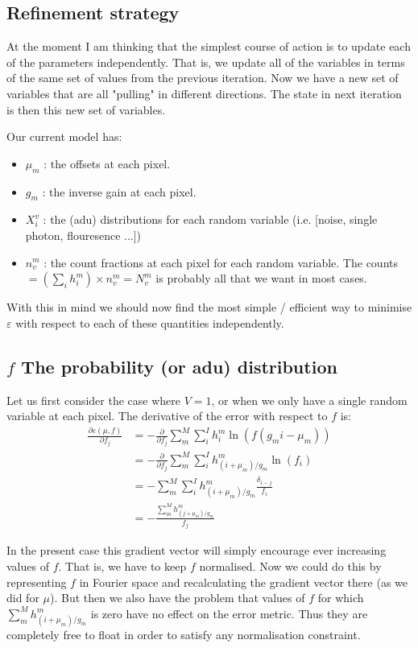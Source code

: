 \documentclass[11pt]{article}
\begin{document}
\subsection{Refinement strategy}
At the moment I am thinking that the simplest course of action is to update each of the parameters independently. That is, we update all of the variables in terms of the same set of values from the previous iteration. Now we have a new set of variables that are all "pulling" in different directions. The state in next iteration is then this new set of variables.

Our current model has:
\begin{itemize}
  \item $\mu_m$ : the offsets at each pixel.
  \item $g_m$   : the inverse gain at each pixel.
  \item $X^v_i$ : the (adu) distributions for each random variable (i.e. [noise, single photon, flouresence ...])
  \item $n^m_v$ : the count fractions at each pixel for each random variable. The counts $= (\sum_i h^m_i) \times n^m_v = N^m_v$ is probably all that we want in most cases.
\end{itemize}

With this in mind we should now find the most simple / efficient way to minimise $\varepsilon$ with respect to each of these quantities independently. 


\subsection{$f$ The probability (or adu) distribution}
Let us first consider the case where $V=1$, or when we only have a single random variable at each pixel. The derivative of the error with respect to $f$ is:
\begin{align}
   \frac{\partial \varepsilon(\mu, f)}{\partial f_j} &= -\frac{\partial}{\partial f_j} \sum_m^M \sum_i^I h^m_i \ln(f(g_mi - \mu_m)) \\
   &= -\frac{\partial}{\partial f_j} \sum_m^M \sum_i^I h^m_{(i+\mu_m)/g_m} \ln(f_i) \\
   &= -\sum_m^M \sum_i^I h^m_{(i+\mu_m)/g_m} \frac{\delta_{i-j}}{f_i} \\
   &= -\frac{\sum_m^M h^m_{(j+\mu_m)/g_m}}{f_j}
\end{align}

In the present case this gradient vector will simply encourage ever increasing values of $f$. That is, we have to keep $f$ normalised. Now we could do this by representing $f$ in Fourier space and recalculating the gradient vector there (as we did for $\mu$). But then we also have the problem that values of $f$ for which $\sum_m^M h^m_{(i+\mu_m)/g_m}$ is zero have no effect on the error metric. Thus they are completely free to float in order to satisfy any normalisation constraint.
\end{document}
